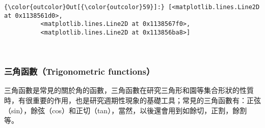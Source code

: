 \documentclass[11pt]{article}
\begin{document}
\begin{Verbatim}[commandchars=\\\{\}]
{\color{outcolor}Out[{\color{outcolor}59}]:} [<matplotlib.lines.Line2D at 0x1138561d0>,
          <matplotlib.lines.Line2D at 0x1138567f0>,
          <matplotlib.lines.Line2D at 0x113856ba8>]
\end{Verbatim}
            
    \begin{center}
    \end{center}
    { \hspace*{\fill} \\}
    
    \hypertarget{ux4e09ux89d2ux51fdux6578trigonometric-functions}{%
\subsubsection{三角函數（Trigonometric
functions）}\label{ux4e09ux89d2ux51fdux6578trigonometric-functions}}

三角函數是常見的關於角的函數，三角函數在研究三角形和園等集合形狀的性質時，有很重要的作用，也是研究週期性現象的基礎工具；常見的三角函數有：正弦（sin），餘弦（cos）和正切（tan），當然，以後還會用到如餘切，正割，餘割等。
\end{document}
